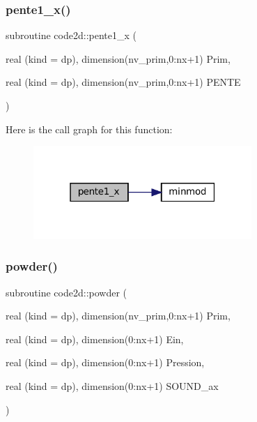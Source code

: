 \mbox{\label{main1DOr2_8f90_ab1369821f897b816d4e9a8f6740ea693}} 
\subsubsection{\texorpdfstring{pente1\+\_\+x()}{pente1\_x()}}
{\footnotesize\ttfamily subroutine code2d\+::pente1\+\_\+x (\begin{DoxyParamCaption}\item[{real (kind = dp), dimension(nv\+\_\+prim,0\+:nx+1)}]{Prim,  }\item[{real (kind = dp), dimension(nv\+\_\+prim,0\+:nx+1)}]{P\+E\+N\+TE }\end{DoxyParamCaption})}

Here is the call graph for this function\+:
\nopagebreak
\begin{figure}[H]
\begin{center}
\leavevmode
\includegraphics[width=235pt]{main1DOr2_8f90_ab1369821f897b816d4e9a8f6740ea693_cgraph}
\end{center}
\end{figure}
\mbox{\label{main1DOr2_8f90_a9a3d7ad4173d691f4f090f6c4c4e05b3}} 
\subsubsection{\texorpdfstring{powder()}{powder()}}
{\footnotesize\ttfamily subroutine code2d\+::powder (\begin{DoxyParamCaption}\item[{real (kind = dp), dimension(nv\+\_\+prim,0\+:nx+1)}]{Prim,  }\item[{real (kind = dp), dimension(0\+:nx+1)}]{Ein,  }\item[{real (kind = dp), dimension(0\+:nx+1)}]{Pression,  }\item[{real (kind = dp), dimension(0\+:nx+1)}]{S\+O\+U\+N\+D\+\_\+ax }\end{DoxyParamCaption})}

